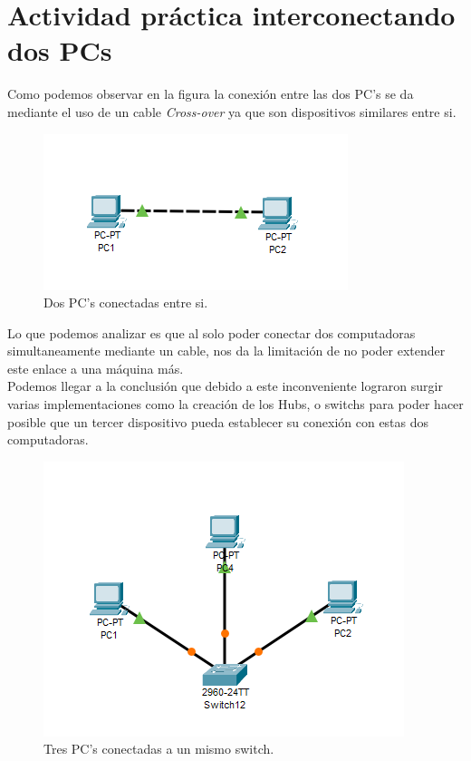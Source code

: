 \documentclass{article}
\begin{document}
 
 \section{Actividad práctica interconectando dos PCs}
Como podemos observar en la figura la conexión entre las dos PC's se da mediante el uso de un cable \textit{Cross-over} ya que son dispositivos similares entre si.
    \begin{figure}[H]
        \centering
        \includegraphics{PacketTracer_bNPPSspTGp.png}
        \caption{Dos PC's conectadas entre si.}
        \label{fig:figura 1}
    \end{figure}

Lo que podemos analizar es que al solo poder conectar dos computadoras simultaneamente mediante un cable, nos da la limitación de no poder extender este enlace a una máquina más. 
\\Podemos llegar a la conclusión que debido a este inconveniente lograron surgir varias implementaciones como la creación de los Hubs, o switchs para poder hacer posible que un tercer dispositivo pueda establecer su conexión con estas dos computadoras.
     \begin{figure}[H]
        \centering
        \includegraphics{PacketTracer_25tnBqSEIw.png}
        \caption{Tres PC's conectadas a un mismo switch. }
        \label{fig:figura 2}
    \end{figure}
\end{document}
